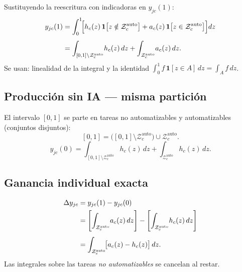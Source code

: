 \documentclass[11pt, a4paper]{article}
\newcommand{\ind}[1]{\mathbf{1}\!\left[#1\right]}
\begin{document}
\begin{demobox}
Sustituyendo la reescritura con indicadoras en $y_{jc}(1)$:
\begin{align}
  y_{jc}(1) &= \int_0^1\!\Bigl[h_c(z)\,\ind{z \notin \mathcal{Z}^{\mathrm{auto}}_c}
               + a_c(z)\,\ind{z \in \mathcal{Z}^{\mathrm{auto}}_c}\Bigr]dz \\[4pt]
             &= \int_{[0,1]\setminus\mathcal{Z}^{\mathrm{auto}}_c}\!h_c(z)\,dz
               + \int_{\mathcal{Z}^{\mathrm{auto}}_c}\!a_c(z)\,dz.
\end{align}
Se usan: linealidad de la integral y la identidad
$\int_0^1 f\,\ind{z\in A}\,dz = \int_A f\,dz$.
\end{demobox}

\subsection{Producci\'on sin IA --- misma partici\'on}

\begin{demobox}
El intervalo $[0,1]$ se parte en tareas no automatizables y automatizables (conjuntos disjuntos):
\[
  [0,1] = \bigl([0,1]\setminus\mathcal{Z}^{\mathrm{auto}}_c\bigr)\cup\mathcal{Z}^{\mathrm{auto}}_c.
\]
\begin{equation}
  y_{jc}(0) = \int_{[0,1]\setminus\mathcal{Z}^{\mathrm{auto}}_c}\!h_c(z)\,dz
             + \int_{\mathcal{Z}^{\mathrm{auto}}_c}\!h_c(z)\,dz.
\end{equation}
\end{demobox}

\subsection{Ganancia individual exacta}

\begin{demobox}
\begin{align}
  \Delta y_{jc} &= y_{jc}(1) - y_{jc}(0) \notag\\
  &= \left[\int_{\mathcal{Z}^{\mathrm{auto}}_c}\!a_c(z)\,dz\right]
    - \left[\int_{\mathcal{Z}^{\mathrm{auto}}_c}\!h_c(z)\,dz\right] \\[4pt]
  &= \int_{\mathcal{Z}^{\mathrm{auto}}_c}\!\bigl[a_c(z)-h_c(z)\bigr]\,dz.
\end{align}
Las integrales sobre las tareas \emph{no automatizables} se cancelan al restar.
\end{demobox}
\end{document}
